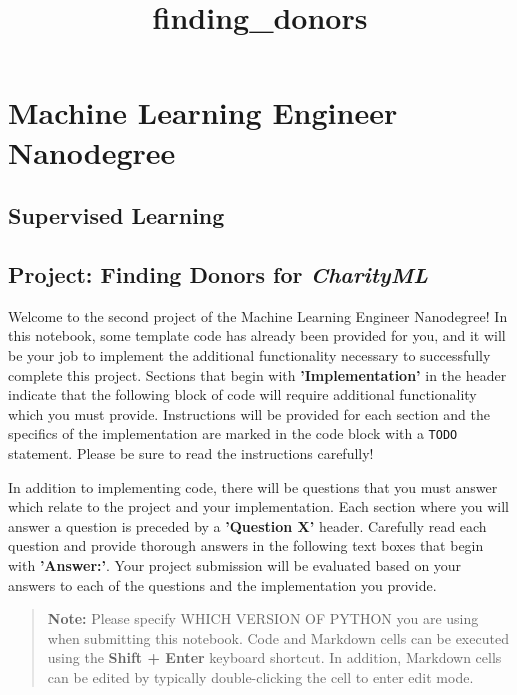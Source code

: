\documentclass[11pt]{article}
\title{finding\_donors}
\begin{document}
    
    
    \maketitle
    
    

    
    \section{Machine Learning Engineer
Nanodegree}\label{machine-learning-engineer-nanodegree}

\subsection{Supervised Learning}\label{supervised-learning}

\subsection{\texorpdfstring{Project: Finding Donors for
\emph{CharityML}}{Project: Finding Donors for CharityML}}\label{project-finding-donors-for-charityml}

    Welcome to the second project of the Machine Learning Engineer
Nanodegree! In this notebook, some template code has already been
provided for you, and it will be your job to implement the additional
functionality necessary to successfully complete this project. Sections
that begin with \textbf{'Implementation'} in the header indicate that
the following block of code will require additional functionality which
you must provide. Instructions will be provided for each section and the
specifics of the implementation are marked in the code block with a
\texttt{\textquotesingle{}TODO\textquotesingle{}} statement. Please be
sure to read the instructions carefully!

In addition to implementing code, there will be questions that you must
answer which relate to the project and your implementation. Each section
where you will answer a question is preceded by a \textbf{'Question X'}
header. Carefully read each question and provide thorough answers in the
following text boxes that begin with \textbf{'Answer:'}. Your project
submission will be evaluated based on your answers to each of the
questions and the implementation you provide.

\begin{quote}
\textbf{Note:} Please specify WHICH VERSION OF PYTHON you are using when
submitting this notebook. Code and Markdown cells can be executed using
the \textbf{Shift + Enter} keyboard shortcut. In addition, Markdown
cells can be edited by typically double-clicking the cell to enter edit
mode.
\end{quote}
\end{document}
